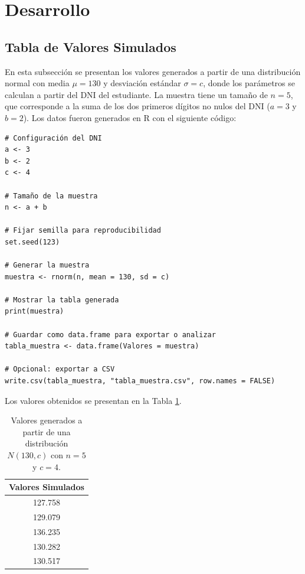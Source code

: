 \documentclass[a4paper,12pt]{article}
\begin{document}
\section{Desarrollo}
\subsection{Tabla de Valores Simulados}

En esta subsección se presentan los valores generados a partir de una distribución normal con media \( \mu = 130 \) y desviación estándar \( \sigma = c \), donde los parámetros se calculan a partir del DNI del estudiante. La muestra tiene un tamaño de \( n = 5 \), que corresponde a la suma de los dos primeros dígitos no nulos del DNI (\( a = 3 \) y \( b = 2 \)). Los datos fueron generados en R con el siguiente código:

\begin{verbatim}
# Configuración del DNI
a <- 3
b <- 2
c <- 4

# Tamaño de la muestra
n <- a + b

# Fijar semilla para reproducibilidad
set.seed(123)

# Generar la muestra
muestra <- rnorm(n, mean = 130, sd = c)

# Mostrar la tabla generada
print(muestra)

# Guardar como data.frame para exportar o analizar
tabla_muestra <- data.frame(Valores = muestra)

# Opcional: exportar a CSV
write.csv(tabla_muestra, "tabla_muestra.csv", row.names = FALSE)
\end{verbatim}

Los valores obtenidos se presentan en la Tabla \ref{tab:valores_simulados}.

\begin{table}[h!]
\centering
\begin{tabular}{|c|}
\hline
\textbf{Valores Simulados} \\ \hline
127.758 \\ \hline
129.079 \\ \hline
136.235 \\ \hline
130.282 \\ \hline
130.517 \\ \hline
\end{tabular}
\caption{Valores generados a partir de una distribución \(N(130, c)\) con \( n = 5 \) y \( c = 4 \).}
\label{tab:valores_simulados}
\end{table}
\end{document}
